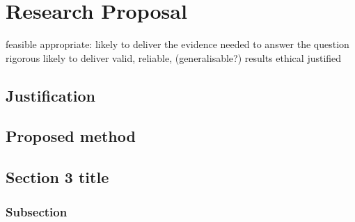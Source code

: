 \chapter{Research Proposal}

feasible
appropriate:  likely to deliver the evidence needed to answer the question
rigorous
likely to deliver valid, reliable, (generalisable?) results
ethical
justified


\section{Justification}

\section{Proposed method}

\section{Section 3 title}

\subsection{Subsection}